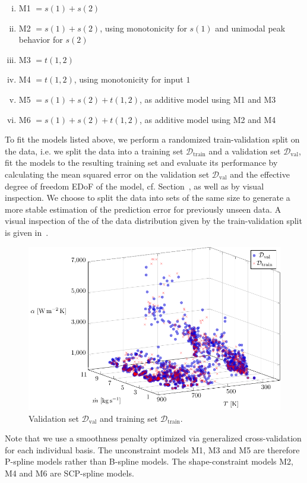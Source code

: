 \begin{enumerate}[(i)]
	\item M1 $= s(1) + s(2)$
	\item M2 $= s(1) + s(2)$, using monotonicity for $s(1)$ and unimodal peak behavior for $s(2)$
	\item M3 $= t(1,2)$
	\item M4 $= t(1,2)$, using monotonicity for input $1$
	\item M5 $= s(1) + s(2) + t(1,2)$, as additive model using M1 and M3
	\item M6 $= s(1) +s(2) + t(1,2)$, as additive model using M2 and M4
\end{enumerate}
%
To fit the models listed above, we perform a randomized train-validation split on the data, i.e. we split the data into a training set $\mathcal{D}_{\text{train}}$ and a validation set $\mathcal{D}_{\text{val}}$, fit the models to the resulting training set and evaluate its performance by calculating the mean squared error on the validation set $\mathcal{D}_{\text{val}}$ and the effective degree of freedom EDoF of the model, cf. Section~, as well as by visual inspection. We choose to split the data into sets of the same size to generate a more stable estimation of the prediction error for previously unseen data. A visual inspection of the of the data distribution given by the train-validation split is given in~.

\begin{figure}[H]
	\centering
	\includegraphics[width=\columnwidth]{graphics/pgfplots/cha5/Ebner/train-val-split.pdf}
	\caption{Validation set $\mathcal{D}_{\text{val}}$ and training set $\mathcal{D}_{\text{train}}$.}
	\label{fig:ebner-train-val-split}
\end{figure}
%
Note that we use a smoothness penalty optimized via generalized cross-validation for each individual basis. The unconstraint models M1, M3 and M5 are therefore P-spline models rather than B-spline models. The shape-constraint models M2, M4 and M6 are SCP-spline models. 

